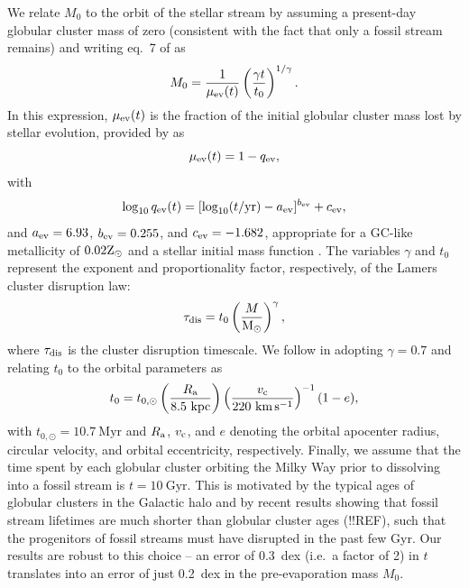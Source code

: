 \documentclass[twocolumn]{aastex63}
\newcommand{\msun}{\ensuremath{\textrm{M}_\odot}}
\newcommand{\myr}{\ensuremath{\textrm{Myr}}}
\newcommand{\gyr}{\ensuremath{\textrm{Gyr}}}
\newcommand{\kpc}{\ensuremath{\textrm{kpc}}}
\newcommand{\kms}{\ensuremath{\textrm{km}\,\textrm{s}^{-1}}}
\begin{document}
We relate $M_0$ to the orbit of the stellar stream by assuming a present-day globular cluster mass of zero (consistent with the fact that only a fossil stream remains) and writing eq.~7 of \citet{lamers05} as
\begin{equation}
\label{eq:m0}
M_{\rm 0}=\frac{1}{\mu_{\rm ev}(t)}\left(\frac{\gamma t}{t_0}\right)^{1/\gamma} .
\end{equation}
In this expression, $\mu_{\rm ev}(t)$ is the fraction of the initial globular cluster mass lost by stellar evolution, provided by \citet{lamers05} as
\begin{equation}
\label{eq:muev}
\mu_{\rm ev}(t)=1-q_{\rm ev} ,
\end{equation}
with
\begin{equation}
\label{eq:qev}
\log_{10}{q_{\rm ev}}(t) = [\log_{10}(t/{\rm yr})-a_{\rm ev}]^{b_{\rm ev}}+c_{\rm ev} ,
\end{equation}
and $a_{\rm ev} = 6.93$, $b_{\rm ev} = 0.255$, and $c_{\rm ev} = -1.682$, appropriate for a GC-like metallicity of $0.02{\rm Z}_\odot$ and a \citet{kroupa01} stellar initial mass function \citep{kruijssen08}. The variables $\gamma$ and $t_0$ represent the exponent and proportionality factor, respectively, of the Lamers cluster disruption law:
\begin{equation}
\label{eq:lamers}
\tau_{\rm dis}=t_0\left(\frac{M}{\msun}\right)^\gamma ,
\end{equation}
where $\tau_{\rm dis}$ is the cluster disruption timescale. We follow \citet{kruijssen09} in adopting $\gamma=0.7$ and relating $t_0$ to the orbital parameters as
\begin{equation}
\label{eq:t0}
t_0 = t_{0,\odot}\left(\frac{R_{\rm a}}{8.5~\kpc}\right)\left(\frac{v_{\rm c}}{220~\kms}\right)^{-1}(1-e) ,
\end{equation}
with $t_{0,\odot}=10.7~\myr$ and $R_{\rm a}$, $v_{\rm c}$, and $e$ denoting the orbital apocenter radius, circular velocity, and orbital eccentricity, respectively. Finally, we assume that the time spent by each globular cluster orbiting the Milky Way prior to dissolving into a fossil stream is $t=10~\gyr$. This is motivated by the typical ages of globular clusters in the Galactic halo \citep[$\sim12~\gyr$, e.g.][]{kruijssen19e} and by recent results showing that fossil stream lifetimes are much shorter than globular cluster ages (!!REF), such that the progenitors of fossil streams must have disrupted in the past few Gyr. Our results are robust to this choice -- an error of 0.3~dex (i.e.\ a factor of 2) in $t$ translates into an error of just 0.2~dex in the pre-evaporation mass $M_0$.
\end{document}
